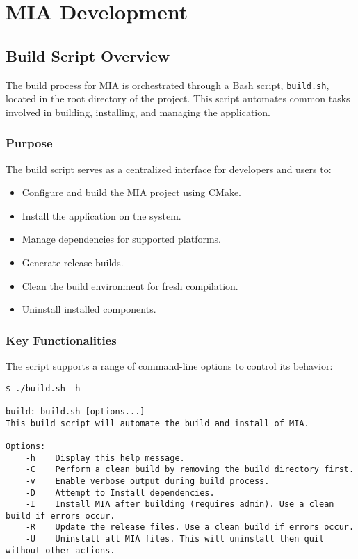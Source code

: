 \chapter{MIA Development}
\pagestyle{fancy}















\section{Build Script Overview}
\label{sec:build-script}

The build process for MIA is orchestrated through a Bash script, \texttt{build.sh}, located in the root directory of the project. This script automates common tasks involved in building, installing, and managing the application.

\subsection{Purpose}

The build script serves as a centralized interface for developers and users to:
\begin{itemize}
	\item Configure and build the MIA project using CMake.
	\item Install the application on the system.
	\item Manage dependencies for supported platforms.
	\item Generate release builds.
	\item Clean the build environment for fresh compilation.
	\item Uninstall installed components.
\end{itemize}

\subsection{Key Functionalities}

The script supports a range of command-line options to control its behavior:
\begin{lstlisting}[style=terminalstyle]
$ ./build.sh -h

build: build.sh [options...]
This build script will automate the build and install of MIA.

Options:
	-h    Display this help message.
	-C    Perform a clean build by removing the build directory first.
	-v    Enable verbose output during build process.
	-D    Attempt to Install dependencies.
	-I    Install MIA after building (requires admin). Use a clean build if errors occur.
	-R    Update the release files. Use a clean build if errors occur.
	-U    Uninstall all MIA files. This will uninstall then quit without other actions.
\end{lstlisting}

